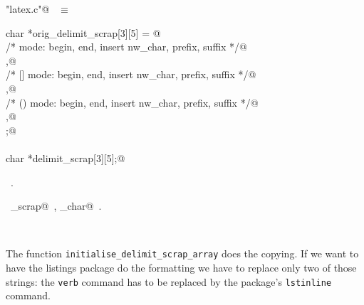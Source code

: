 \documentclass{report}
\begin{document}
\begin{flushleft} \small
\begin{minipage}{\linewidth} \label{scrap67}
\verb@"latex.c"@\nobreak\ {\footnotesize {} }$\equiv$
\vspace{-1ex}
\begin{list}{}{} \item
\mbox{}\verb@static char *orig_delimit_scrap[3][5] = {@\\
\mbox{}\verb@  /* {} mode: begin, end, insert nw_char, prefix, suffix */@\\
\mbox{},@\\
\mbox{}\verb@  /* [] mode: begin, end, insert nw_char, prefix, suffix */@\\
\mbox{},@\\
\mbox{}\verb@  /* () mode: begin, end, insert nw_char, prefix, suffix */@\\
\mbox{},@\\
\mbox{}\verb@};@\\
\mbox{}\verb@@\\
\mbox{}\verb@static char *delimit_scrap[3][5];@\\
\mbox{}\verb@@{\NWsep}
\end{list}
\vspace{-1ex}
\footnotesize\addtolength{\baselineskip}{-1ex}
\begin{list}{}{\setlength{\itemsep}{-\parsep}\setlength{\itemindent}{-\leftmargin}}
\item \NWtxtFileDefBy\ .
\end{list}
\vspace{-2ex}
\footnotesize\addtolength{\baselineskip}{-1ex}
\begin{list}{}{\setlength{\itemsep}{-\parsep}\setlength{\itemindent}{-\leftmargin}}
\item \NWtxtIdentsUsed\nobreak\  \verb@delimit_scrap@\nobreak\ , \verb@nw_char@\nobreak\ .\end{list}
\end{minipage}\\[4ex]
\end{flushleft}
The function \texttt{initialise\_delimit\_scrap\_array} does the
copying. If we want to have the listings package 
do the formatting we have to replace only two of those strings: the
\texttt{verb} command has to be replaced by the package's \texttt{lstinline}
command.
\end{document}
